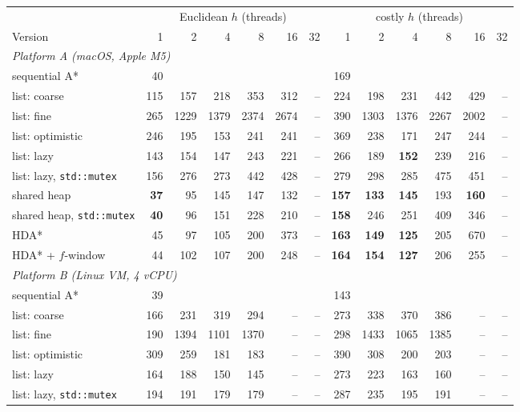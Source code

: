 \begin{tabular}{lrrrrrrrrrrrr}
\toprule
 & \multicolumn{6}{c}{Euclidean $h$ (threads)} & \multicolumn{6}{c}{costly $h$ (threads)} \\
\cmidrule(lr){2-7}\cmidrule(lr){8-13}
Version & 1 & 2 & 4 & 8 & 16 & 32 & 1 & 2 & 4 & 8 & 16 & 32 \\
\midrule
\multicolumn{13}{l}{\emph{Platform A (macOS, Apple M5)}} \\
sequential A* & 40 &  &  &  &  &  & 169 &  &  &  &  &  \\
list: coarse & 115 & 157 & 218 & 353 & 312 & -- & 224 & 198 & 231 & 442 & 429 & -- \\
list: fine & 265 & 1229 & 1379 & 2374 & 2674 & -- & 390 & 1303 & 1376 & 2267 & 2002 & -- \\
list: optimistic & 246 & 195 & 153 & 241 & 241 & -- & 369 & 238 & 171 & 247 & 244 & -- \\
list: lazy & 143 & 154 & 147 & 243 & 221 & -- & 266 & 189 & \textbf{152} & 239 & 216 & -- \\
list: lazy, \texttt{std::mutex} & 156 & 276 & 273 & 442 & 428 & -- & 279 & 298 & 285 & 475 & 451 & -- \\
shared heap & \textbf{37} & 95 & 145 & 147 & 132 & -- & \textbf{157} & \textbf{133} & \textbf{145} & 193 & \textbf{160} & -- \\
shared heap, \texttt{std::mutex} & \textbf{40} & 96 & 151 & 228 & 210 & -- & \textbf{158} & 246 & 251 & 409 & 346 & -- \\
HDA* & 45 & 97 & 105 & 200 & 373 & -- & \textbf{163} & \textbf{149} & \textbf{125} & 205 & 670 & -- \\
HDA* + $f$-window & 44 & 102 & 107 & 200 & 248 & -- & \textbf{164} & \textbf{154} & \textbf{127} & 206 & 255 & -- \\
\midrule
\multicolumn{13}{l}{\emph{Platform B (Linux VM, 4 vCPU)}} \\
sequential A* & 39 &  &  &  &  &  & 143 &  &  &  &  &  \\
list: coarse & 166 & 231 & 319 & 294 & -- & -- & 273 & 338 & 370 & 386 & -- & -- \\
list: fine & 190 & 1394 & 1101 & 1370 & -- & -- & 298 & 1433 & 1065 & 1385 & -- & -- \\
list: optimistic & 309 & 259 & 181 & 183 & -- & -- & 390 & 308 & 200 & 203 & -- & -- \\
list: lazy & 164 & 188 & 150 & 145 & -- & -- & 273 & 223 & 163 & 160 & -- & -- \\
list: lazy, \texttt{std::mutex} & 194 & 191 & 179 & 179 & -- & -- & 287 & 235 & 195 & 191 & -- & -- \\

\end{tabular}
